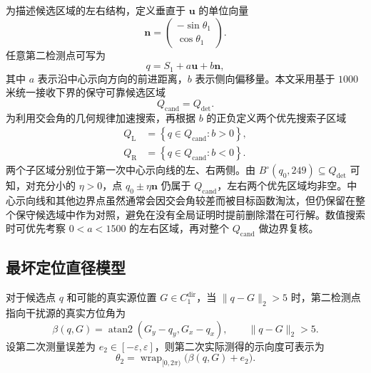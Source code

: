 为描述候选区域的左右结构，定义垂直于 $\mathbf u$ 的单位向量
\begin{equation}
  \mathbf n=
  \begin{pmatrix}
    -\sin\theta_1\\
    \cos\theta_1
  \end{pmatrix}.
  \label{eq:q2-normal-direction}
\end{equation}
任意第二检测点可写为
\begin{equation}
  q=S_1+a\mathbf u+b\mathbf n,
  \label{eq:q2-candidate-parameterization}
\end{equation}
其中 $a$ 表示沿中心示向方向的前进距离，$b$ 表示侧向偏移量。本文采用基于 $1000$ 米统一接收下界的保守可靠候选区域
\begin{equation}
  Q_{\mathrm{cand}}=Q_{\mathrm{det}}.
  \label{eq:q2-candidate-region}
\end{equation}
为利用交会角的几何规律加速搜索，再根据 $b$ 的正负定义两个优先搜索子区域
\begin{align}
  Q_{\mathrm L}
  &=\left\{q\in Q_{\mathrm{cand}}:b>0\right\},
  \label{eq:q2-left-region}\\
  Q_{\mathrm R}
  &=\left\{q\in Q_{\mathrm{cand}}:b<0\right\}.
  \label{eq:q2-right-region}
\end{align}
两个子区域分别位于第一次中心示向线的左、右两侧。由 $B^\circ(q_0,249)\subseteq Q_{\mathrm{det}}$ 可知，对充分小的 $\eta>0$，点 $q_0\pm\eta\mathbf n$ 仍属于 $Q_{\mathrm{cand}}$，左右两个优先区域均非空。中心示向线和其他边界点虽然通常会因交会角较差而被目标函数淘汰，但仍保留在整个保守候选域中作为对照，避免在没有全局证明时提前删除潜在可行解。数值搜索时可优先考察 $0<a<1500$ 的左右区域，再对整个 $Q_{\mathrm{cand}}$ 做边界复核。

\subsection{最坏定位直径模型}

对于候选点 $q$ 和可能的真实源位置 $G\in C_1^{\mathrm{dir}}$，当 $\|q-G\|_2>5$ 时，第二检测点指向干扰源的真实方位角为
\begin{equation}
  \beta(q,G)=\operatorname{atan2}(G_y-q_y,G_x-q_x),
  \qquad \|q-G\|_2>5.
  \label{eq:q2-true-bearing}
\end{equation}
设第二次测量误差为 $e_2\in[-\varepsilon,\varepsilon]$，则第二次实际测得的示向度可表示为
\begin{equation}
  \theta_2=\operatorname{wrap}_{[0,2\pi)}\bigl(\beta(q,G)+e_2\bigr).
  \label{eq:q2-second-bearing}
\end{equation}

